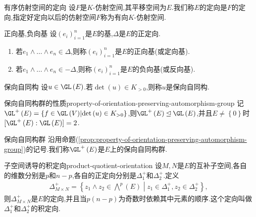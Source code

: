 \begin{definition}{有序仿射空间的定向}{}
	设$F$是$K$-仿射空间,其平移空间为$E$.我们称$E$的定向是$F$的定向,指定好定向以后的仿射空间$F$称为有向$K$-仿射空间.
\end{definition}

\begin{definition}{正向基,负向基}{}
	设$\left(e_{i}\right)_{i=1}^{n}$是$E$的基,$\Delta$是$E$的正定向.
	\begin{enumerate}
		\item 若$e_{1}\wedge\ldots\wedge e_{n}\in\Delta$,则称$\left(e_{i}\right)_{i=1}^{n}$是$E$的正向基(或定向基).
		\item 若$e_{1}\wedge\ldots\wedge e_{n}\in -\Delta$,则称$\left(e_{i}\right)_{i=1}^{n}$是$E$的负向基(或反向基).
	\end{enumerate}
\end{definition}

\begin{definition}{保向自同构}{}
	设$u\in\GL\left(E\right)$.若$\det\left(u\right)\in K_{>0}$,则称$u$是保向自同构.
\end{definition}

\begin{proposition}{保向自同构群的性质}{property-of-orientation-preserving-automorphism-group}
	记$\GL^{+}\left(E\right)=\left\{f\in\GL\left(V\right)\middle|\det\left(u\right)\in K_{>0}\right\}$,则$\GL^{+}\left(E\right)\unlhd\GL\left(E\right)$,并且$E\neq\left\{0\right\}$时$[\GL^{+}\left(E\right):\GL\left(E\right)]=2$.
\end{proposition}

\begin{definition}{保向自同构群}{}
	沿用命题(\cref{prop:property-of-orientation-preserving-automorphism-group})的记号.我们称$\GL^{+}\left(E\right)$是$E$上的保向自同构群.
\end{definition}

\begin{proposition}{子空间诱导的积定向}{product-quotient-orientation}
	设$M,N$是$E$的互补子空间,各自的维数分别是$p$和$n-p$,各自的正定向分别是$\Delta_{1}^{+}$和$\Delta_{2}^{+}$.定义
	\begin{align*}
		\Delta_{M\times N}^{+}=\left\{z_{1}\wedge z_{2}\in\bigwedge\limits^{p}\left(E\right)\middle|z_{1}\in\Delta_{1}^{+},z_{2}\in\Delta_{2}^{+}\right\},
	\end{align*}
	则$\Delta_{M\times N}^{+}$是$E$的定向,并且当$p\left(n-p\right)$为奇数时依赖其中元素的顺序.这个定向叫做$\Delta_{1}^{+}$和$\Delta_{2}^{+}$的积定向.
\end{proposition}

